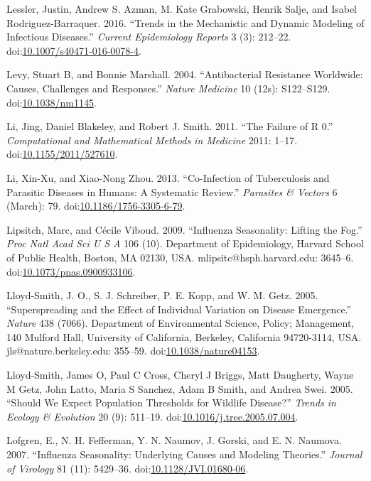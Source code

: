 \documentclass[]{book}
\theoremstyle{definition}
\theoremstyle{definition}
\theoremstyle{definition}
\theoremstyle{remark}
\begin{document}
\hypertarget{ref-lessler16}{}
Lessler, Justin, Andrew S. Azman, M. Kate Grabowski, Henrik Salje, and
Isabel Rodriguez-Barraquer. 2016. ``Trends in the Mechanistic and
Dynamic Modeling of Infectious Diseases.'' \emph{Current Epidemiology
Reports} 3 (3): 212--22.
doi:\href{https://doi.org/10.1007/s40471-016-0078-4}{10.1007/s40471-016-0078-4}.

\hypertarget{ref-levy04}{}
Levy, Stuart B, and Bonnie Marshall. 2004. ``Antibacterial Resistance
Worldwide: Causes, Challenges and Responses.'' \emph{Nature Medicine} 10
(12s): S122--S129.
doi:\href{https://doi.org/10.1038/nm1145}{10.1038/nm1145}.

\hypertarget{ref-li11}{}
Li, Jing, Daniel Blakeley, and Robert J. Smith. 2011. ``The Failure of R
0.'' \emph{Computational and Mathematical Methods in Medicine} 2011:
1--17.
doi:\href{https://doi.org/10.1155/2011/527610}{10.1155/2011/527610}.

\hypertarget{ref-li13}{}
Li, Xin-Xu, and Xiao-Nong Zhou. 2013. ``Co-Infection of Tuberculosis and
Parasitic Diseases in Humans: A Systematic Review.'' \emph{Parasites \&
Vectors} 6 (March): 79.
doi:\href{https://doi.org/10.1186/1756-3305-6-79}{10.1186/1756-3305-6-79}.

\hypertarget{ref-lipsitch09}{}
Lipsitch, Marc, and Cécile Viboud. 2009. ``Influenza Seasonality:
Lifting the Fog.'' \emph{Proc Natl Acad Sci U S A} 106 (10). Department
of Epidemiology, Harvard School of Public Health, Boston, MA 02130, USA.
mlipsitc@hsph.harvard.edu: 3645--6.
doi:\href{https://doi.org/10.1073/pnas.0900933106}{10.1073/pnas.0900933106}.

\hypertarget{ref-lloyd-smith05}{}
Lloyd-Smith, J. O., S. J. Schreiber, P. E. Kopp, and W. M. Getz. 2005.
``Superspreading and the Effect of Individual Variation on Disease
Emergence.'' \emph{Nature} 438 (7066). Department of Environmental
Science, Policy; Management, 140 Mulford Hall, University of California,
Berkeley, California 94720-3114, USA. jls@nature.berkeley.edu: 355--59.
doi:\href{https://doi.org/10.1038/nature04153}{10.1038/nature04153}.

\hypertarget{ref-lloyd-smith05b}{}
Lloyd-Smith, James O, Paul C Cross, Cheryl J Briggs, Matt Daugherty,
Wayne M Getz, John Latto, Maria S Sanchez, Adam B Smith, and Andrea
Swei. 2005. ``Should We Expect Population Thresholds for Wildlife
Disease?'' \emph{Trends in Ecology \& Evolution} 20 (9): 511--19.
doi:\href{https://doi.org/10.1016/j.tree.2005.07.004}{10.1016/j.tree.2005.07.004}.

\hypertarget{ref-lofgren07}{}
Lofgren, E., N. H. Fefferman, Y. N. Naumov, J. Gorski, and E. N.
Naumova. 2007. ``Influenza Seasonality: Underlying Causes and Modeling
Theories.'' \emph{Journal of Virology} 81 (11): 5429--36.
doi:\href{https://doi.org/10.1128/JVI.01680-06}{10.1128/JVI.01680-06}.
\end{document}
